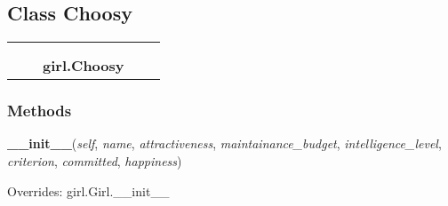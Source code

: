 

\subsection{Class Choosy}

    \label{girl:Choosy}
\begin{tabular}{cccccc}
\multicolumn{2}{r}{\settowidth{\BCL}{girl.Girl}\multirow{2}{\BCL}{girl.Girl}}
&&
  \\\cline{3-3}
  &&\multicolumn{1}{c|}{}
&&
  \\
&&\multicolumn{2}{l}{\textbf{girl.Choosy}}
\end{tabular}



  \subsubsection{Methods}

    \vspace{0.5ex}

\hspace{.8\funcindent}\begin{boxedminipage}{\funcwidth}

    \raggedright \textbf{\_\_init\_\_}(\textit{self}, \textit{name}, \textit{attractiveness}, \textit{maintainance\_budget}, \textit{intelligence\_level}, \textit{criterion}, \textit{committed}, \textit{happiness})

\setlength{\parskip}{2ex}
\setlength{\parskip}{1ex}
      Overrides: girl.Girl.\_\_init\_\_

    \end{boxedminipage}

    \label{girl:Choosy:getHappiness}

    \vspace{0.5ex}

